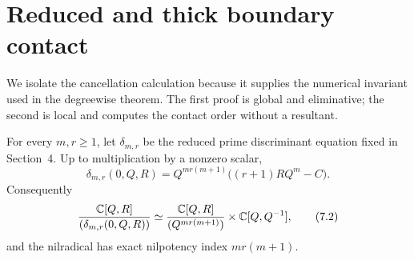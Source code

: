 \section{Reduced and thick boundary contact}

We isolate the cancellation calculation because it supplies the numerical
invariant used in the degreewise theorem.  The first proof is global and
eliminative; the second is local and computes the contact order without a
resultant.

\begin{proposition}
\label{prop:thick-trace}
For every $m,r\ge1$, let $\delta_{m,r}$ be the reduced prime discriminant
equation fixed in Section~4.  Up to multiplication by a nonzero scalar,
\[
 \delta_{m,r}(0,Q,R)
 =Q^{mr(m+1)}\bigl((r+1)RQ^m-C\bigr).                    \tag{7.1}
\]
Consequently
\[
 \frac{\mathbb C[Q,R]}{(\delta_{m,r}(0,Q,R))}
 \simeq
 \frac{\mathbb C[Q,R]}{(Q^{mr(m+1)})}
 \times\mathbb C[Q,Q^{-1}],                                    \tag{7.2}
\]
and the nilradical has exact nilpotency index $mr(m+1)$.
\end{proposition}

